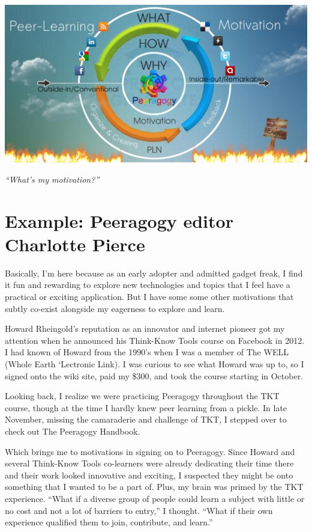 \begin{center}
\includegraphics[width=.8\textwidth]{../pictures/pln-cycle.jpg}
\end{center}

\emph{``What's my motivation?''}

\section*{Example: Peeragogy editor Charlotte Pierce}

Basically, I'm here because as an early adopter and admitted gadget
freak, I find it fun and rewarding to explore new technologies and
topics that I feel have a practical or exciting application. But I have
some some other motivations that subtly co-exist alongside my eagerness
to explore and learn.

Howard Rheingold's reputation as an innovator and internet pioneer got
my attention when he announced his Think-Know Tools course on Facebook
in 2012. I had known of Howard from the 1990's when I was a member of
The WELL (Whole Earth `Lectronic Link). I was curious to see what Howard
was up to, so I signed onto the wiki site, paid my \$300, and took the
course starting in October.

Looking back, I realize we were practicing Peeragogy throughout the TKT
course, though at the time I hardly knew peer learning from a pickle. In
late November, missing the camaraderie and challenge of TKT, I stepped
over to check out The Peeragogy Handbook.

Which brings me to motivations in signing on to Peeragogy. Since Howard
and several Think-Know Tools co-learners were already dedicating their
time there and their work looked innovative and exciting, I suspected
they might be onto something that I wanted to be a part of. Plus, my
brain was primed by the TKT experience. ``What if a diverse group of
people could learn a subject with little or no cost and not a lot of
barriers to entry,'' I thought. ``What if their own experience qualified
them to join, contribute, and learn.''

